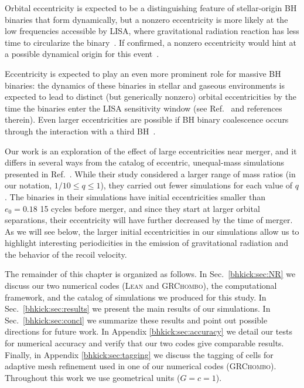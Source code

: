 Orbital eccentricity is expected to be a distinguishing feature of
stellar-origin BH binaries that form dynamically, but a nonzero
eccentricity is more likely at the low frequencies accessible by LISA,
where gravitational radiation reaction has less time to circularize
the binary~\cite{Nishizawa:2016jji,Breivik:2016ddj,Nishizawa:2016eza}.
If confirmed, a nonzero eccentricity would hint at a possible
dynamical origin for this event~\cite{Romero-Shaw:2020thy}.

Eccentricity is expected to play an even more prominent role for
massive BH binaries: the dynamics of these binaries in stellar and
gaseous environments is expected to lead to distinct (but generically
nonzero) orbital eccentricities by the time the binaries enter the
LISA sensitivity window (see Ref.~\cite{Roedig:2011rn} and references
therein). Even larger eccentricities are possible if BH binary
coalescence occurs through the interaction with a third
BH~\cite{Bonetti:2018tpf}.

Our work is an exploration of the effect of large eccentricities near
merger, and it differs in several ways from the catalog of eccentric,
unequal-mass simulations presented in Ref.~\cite{Huerta:2019oxn}.
While their study considered a larger range of mass ratios (in our
notation, $1/10\leq q\leq 1$), they carried out fewer simulations for
each value of $q$. The binaries in their simulations have initial
eccentricities smaller than $e_0 = 0.18$ 15 cycles before merger,
and since they start at larger orbital separations,
their eccentricity will have further decreased by the time of merger.
As we will see below, the larger initial eccentricities in
our simulations allow us to highlight interesting periodicities in the
emission of gravitational radiation and the behavior of the recoil
velocity.

The remainder of this chapter is organized as follows.
%
In Sec.~\ref{bhkick:sec:NR} we discuss our two numerical codes (\textsc{Lean}
and \textsc{GRChombo}), the computational framework, and the catalog
of simulations we produced for this study. In Sec.~\ref{bhkick:sec:results}
we present the main results of our simulations. In
Sec.~\ref{bhkick:sec:concl} we summarize these results and point out possible
directions for future work. In Appendix \ref{bhkick:sec:accuracy} we
detail our tests for numerical accuracy and verify that
our two codes give comparable results.
Finally, in Appendix \ref{bhkick:sec:tagging} we
discuss the tagging of cells for adaptive mesh refinement used in one
of our numerical codes (\textsc{GRChombo}).
%
Throughout this work we use geometrical units ($G=c=1$).

